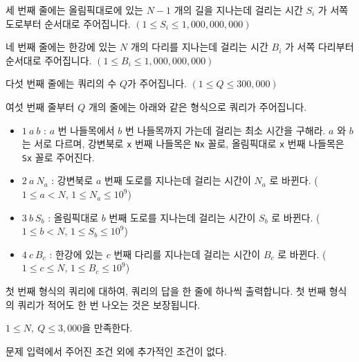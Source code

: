 \begin{problem}{\kcpcnavigationtitle}
    세 번째 줄에는 올림픽대로에 있는 $ N-1 $ 개의 길을 지나는데 걸리는 시간 $ S_i $ 가 서쪽 도로부터 순서대로 주어집니다. $ (1 \leq S_i \leq 1,000,000,000) $
    
    네 번째 줄에는 한강에 있는 $ N $ 개의 다리를 지나는데 걸리는 시간 $ B_i $ 가 서쪽 다리부터 순서대로 주어집니다. $ (1 \leq B_i \leq 1,000,000,000) $
    
    다섯 번째 줄에는 쿼리의 수 $ Q $가 주어집니다. $ (1 \leq Q \leq 300,000) $
    
    여섯 번째 줄부터 $ Q $ 개의 줄에는 아래와 같은 형식으로 쿼리가 주어집니다.
    
    \begin{itemize}
        \item $ 1\ a\ b $ : $ a $ 번 나들목에서 $ b $ 번 나들목까지 가는데 걸리는 최소 시간을 구해라. $ a $ 와 $ b $ 는 서로 다르며, 강변북로 \verb|x| 번째 나들목은 \verb|Nx| 꼴로, 올림픽대로 \verb|x| 번째 나들목은 \verb|Sx| 꼴로 주어진다.
        \item $ 2\ a\ N_a $ : 강변북로 $ a $ 번째 도로를 지나는데 걸리는 시간이 $ N_a $ 로 바뀐다. ($ 1 \leq a < N $, $ 1 \leq N_a \leq 10^9 $)
        \item $ 3\ b\ S_b $ : 올림픽대로 $ b $ 번째 도로를 지나는데 걸리는 시간이 $ S_b $ 로 바뀐다. ($1 \leq b < N$, $ 1 \leq S_b \leq 10^9 $)
        \item $ 4\ c\ B_c $ : 한강에 있는 $ c $ 번째 다리를 지나는데 걸리는 시간이 $ B_c $ 로 바뀐다. ($ 1 \leq c \leq N $, $ 1 \leq B_c \leq 10^9 $) 
    \end{itemize}
        
    \OutputFile
    첫 번째 형식의 쿼리에 대하여, 쿼리의 답을 한 줄에 하나씩 출력합니다. 첫 번째 형식의 쿼리가 적어도 한 번 나오는 것은 보장됩니다.
    
    \SubtaskWithScore{\kcpcnavigationsmallscore}
    $ 1 \leq N,\ Q \leq 3,000 $을 만족한다.
    
    \SubtaskWithScore{\kcpcnavigationlargescore}
    문제 입력에서 주어진 조건 외에 추가적인 조건이 없다.

    \Examples
    
    \begin{example}
    \end{example}
    
\end{problem}

